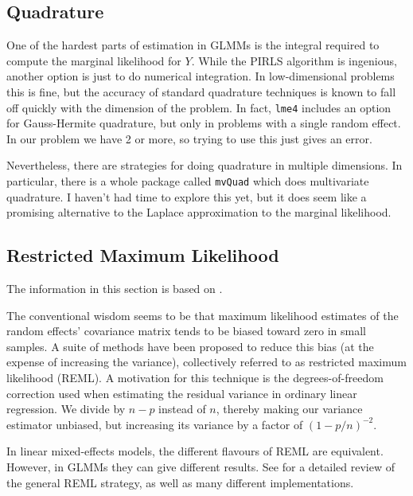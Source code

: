 \documentclass{article}
\begin{document}
\subsection{Quadrature}

One of the hardest parts of estimation in GLMMs is the integral required to compute the marginal likelihood for $Y$. While the PIRLS algorithm is ingenious, another option is just to do numerical integration. In low-dimensional problems this is fine, but the accuracy of standard quadrature techniques is known to fall off quickly with the dimension of the problem. In fact, \texttt{lme4} includes an option for Gauss-Hermite quadrature, but only in problems with a single random effect. In our problem we have 2 or more, so trying to use this just gives an error.

Nevertheless, there are strategies for doing quadrature in multiple dimensions. In particular, there is a whole package called \texttt{mvQuad} \citep{Wei23} which does multivariate quadrature. I haven't had time to explore this yet, but it does seem like a promising alternative to the Laplace approximation to the marginal likelihood.

\subsection{Restricted Maximum Likelihood}

The information in this section is based on \citet{Mae24}.

The conventional wisdom seems to be that maximum likelihood estimates of the random effects' covariance matrix tends to be biased toward zero in small samples. A suite of methods have been proposed to reduce this bias (at the expense of increasing the variance), collectively referred to as restricted maximum likelihood (REML). A motivation for this technique is the degrees-of-freedom correction used when estimating the residual variance in ordinary linear regression. We divide by $n-p$ instead of $n$, thereby making our variance estimator unbiased, but increasing its variance by a factor of $(1 - p/n)^{-2}$.

In linear mixed-effects models, the different flavours of REML are equivalent. However, in GLMMs they can give different results. See \citet{Mae24} for a detailed review of the general REML strategy, as well as many different implementations.



\end{document}
